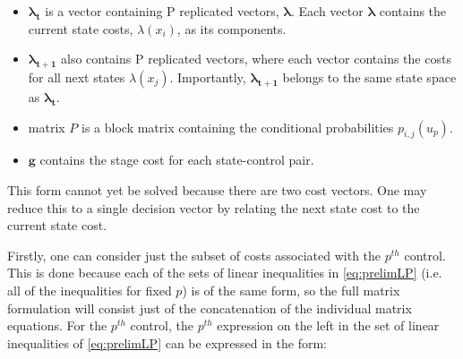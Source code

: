 \documentclass[conference]{IEEEtran}
\begin{document}
\begin{itemize}
	\item $\boldsymbol{\lambda_{t}}$ is a vector containing P replicated vectors, $\boldsymbol{\lambda}$. Each vector $\boldsymbol{\lambda}$ contains the current state costs, $\lambda(x_{i})$, as its components. %
	
	\item $\boldsymbol{\lambda_{t+1}}$ also contains P replicated vectors, where each vector contains the costs for all next states $\lambda(x_{j})$. Importantly, $\boldsymbol{\lambda_{t+1}}$ belongs to the same state space as $\boldsymbol{\lambda_{t}}$. %
	
	\item matrix $P$ is a block  matrix containing the conditional probabilities $p_{i,j}(u_{p})$. %
	
	\item $\boldsymbol{g}$ contains the stage cost for each state-control pair. %
\end{itemize}

This form cannot yet be solved because there are two cost vectors. One may reduce this to a single decision vector by relating the next state cost to the current state cost.

Firstly, one can consider just the subset of costs associated with the $p^{th}$ control. This is done because each of the sets of linear inequalities in \eqref{eq:prelimLP} (i.e. all of the inequalities for fixed $p$) is of the same form, so the full matrix formulation will consist just of the concatenation of the individual matrix equations. For the $p^{th}$ control, the $p^{th}$ expression on the left in the set of linear inequalities of \eqref{eq:prelimLP} can be expressed in the form:
\end{document}
